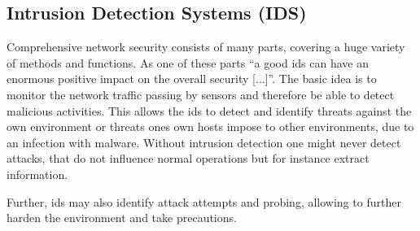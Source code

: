 

\subsection{Intrusion Detection Systems (IDS)}
\label{sec:background:network:ids}

Comprehensive network security consists of many parts, covering a huge variety of methods and functions. 
As one of these parts \enquote{a good \gls{ids} can have an enormous positive impact on the overall security [...]}. \parencite{Northcutt2005}
The basic idea is to monitor the network traffic passing by sensors and therefore be able to detect malicious activities.
This allows the \gls{ids} to detect and identify threats against the own environment or threats ones own hosts impose to other environments, due to an infection with malware.
Without intrusion detection one might never detect attacks, that do not influence normal operations but for instance extract information.

Further, \gls{ids} may also identify attack attempts and probing, allowing to further harden the environment and take precautions.

